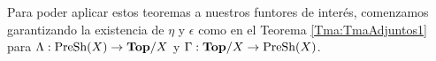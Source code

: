 Para poder aplicar estos teoremas a nuestros funtores de interés, comenzamos garantizando la existencia de $\eta$ y $\epsilon$ como en el Teorema \ref{Tma:TmaAdjuntos1} para $\Lambda:\normalfont{\text{PreSh}}(X)\to\normalfont{\textbf{Top}}/X$ y $\Gamma:\normalfont{\textbf{Top}}/X\to\normalfont{\text{PreSh}}(X)$.

   
   
   

